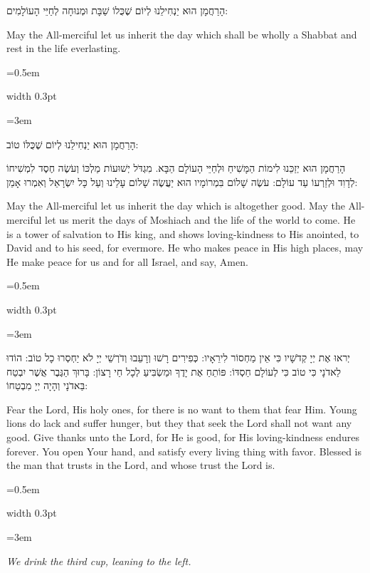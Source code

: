 \documentclass[11pt, openany]{book}
\newcommand{\instruction}[1]{%
  \par\vspace{3pt}
  \begin{tcolorbox}[
    enhanced,
    breakable,
    colback=sederlight,
    colframe=sederlight,
    boxrule=0pt,
    left=10pt,
    right=6pt,
    top=4pt,
    bottom=4pt,
    borderline west={2pt}{0pt}{sederwine!60},
    arc=0pt,
    outer arc=0pt,
  ]
    {\small\itshape\textcolor{sederwine}{#1}}
  \end{tcolorbox}
  \par\vspace{2pt}
}
\newlength{\bidiHebWidth}
\newlength{\bidiEngWidth}
\newenvironment{bilingual}{%
  \par\vspace{4pt}%
}{%
  \noindent
  \begin{minipage}[t]{\bidiEngWidth}
    \setstretch{1.4}\emergencystretch=0.5em\normalsize
    \usebox{\bidiEngBox}
  \end{minipage}%
  \hfill
  {\color{sedergold}\vrule width 0.3pt}%
  \hfill
  \begin{minipage}[t]{\bidiHebWidth}
    \begingroup\hebrewfont\TeXXeTstate=1\beginR
    \large\setstretch{1.4}\emergencystretch=3em\tolerance=9999\parindent=0pt\relax
    \usebox{\bidiHebBox}
    \endR\endgroup
  \end{minipage}%
  \par\vspace{2pt}%
}
\newenvironment{hebrewcol}{%
  \begin{lrbox}{\bidiHebBox}\begin{minipage}{\bidiHebWidth}%
}{%
  \end{minipage}\end{lrbox}%
}
\newenvironment{englishcol}{%
  \begin{lrbox}{\bidiEngBox}\begin{minipage}{\bidiEngWidth}%
}{%
  \end{minipage}\end{lrbox}%
}
\newenvironment{shabbatadd}{%
  \par\vspace{3pt}
  \begin{tcolorbox}[
    enhanced,
    breakable,
    colback=sederblue!6,
    colframe=sederblue!6,
    boxrule=0pt,
    left=10pt,
    right=10pt,
    top=6pt,
    bottom=6pt,
    borderline north={0.5pt}{0pt}{sederblue!25},
    borderline south={0.5pt}{0pt}{sederblue!25},
    arc=0pt,
    outer arc=0pt,
    before upper={\small\textcolor{sederblue}{\textit{On Shabbat add:}}\par\vspace{2pt}},
  ]
}{%
  \end{tcolorbox}
  \par\vspace{3pt}
}
\begin{document}
\begin{shabbatadd}
\begin{bilingual}
\begin{hebrewcol}
הָרַחֲמָן הוּא יַנְחִילֵנוּ לְיוֹם שֶׁכֻּלוֹ שַׁבָּת וּמְנוּחָה לְחַיֵּי הָעוֹלָמִים:
\end{hebrewcol}
\begin{englishcol}
May the All-merciful let us inherit the day which shall be wholly a Shabbat and rest in the life everlasting.
\end{englishcol}
\end{bilingual}
\end{shabbatadd}
\begin{bilingual}
\begin{hebrewcol}
הָרַחֲמָן הוּא יַנְחִילֵנוּ לְיוֹם שֶׁכֻּלּוֹ טוֹב:

הָרַחֲמָן הוּא יְזַכֵּנוּ לִימוֹת הַמָּשִׁיחַ וּלְחַיֵּי הָעוֹלָם הַבָּא. מִגְדֹּל יְשׁוּעוֹת מַלְכּוֹ וְעֹשֶׂה חֶסֶד לִמְשִׁיחוֹ לְדָוִד וּלְזַרְעוֹ עַד עוֹלָם: עֹשֶׂה שָׁלוֹם בִּמְרוֹמָיו הוּא יַעֲשֶׂה שָׁלוֹם עָלֵינוּ וְעַל כָּל יִשְׂרָאֵל וְאִמְרוּ אָמֵן:
\end{hebrewcol}
\begin{englishcol}
May the All-merciful let us inherit the day which is altogether good. May the All-merciful let us merit the days of Moshiach and the life of the world to come. He is a tower of salvation to His king, and shows loving-kindness to His anointed, to David and to his seed, for evermore. He who makes peace in His high places, may He make peace for us and for all Israel, and say, Amen.
\end{englishcol}
\end{bilingual}
\begin{bilingual}
\begin{hebrewcol}
יְראוּ אֶת יְיָ קְדֹשָׁיו כִּי אֵין מַחְסוֹר לִירֵאָיו: כְּפִירִים רָשׁוּ וְרָעֵבוּ וְדֹרְשֵׁי יְיָ לֹא יַחְסְרוּ כָל טוֹב: הוֹדוּ לַאדֹנָי כִּי טוֹב כִּי לְעוֹלָם חַסְדּוֹ: פּוֹתֵחַ אֶת יָדֶךָ וּמַשְׂבִּיעַ לְכָל חַי רָצוֹן: בָּרוּךְ הַגֶּבֶר אֲשֶׁר יִבְטַח בַּאדֹנָי וְהָיָה יְיָ מִבְטַחוֹ:
\end{hebrewcol}
\begin{englishcol}
Fear the Lord, His holy ones, for there is no want to them that fear Him. Young lions do lack and suffer hunger, but they that seek the Lord shall not want any good. Give thanks unto the Lord, for He is good, for His loving-kindness endures forever. You open Your hand, and satisfy every living thing with favor. Blessed is the man that trusts in the Lord, and whose trust the Lord is.
\end{englishcol}
\end{bilingual}
\instruction{We drink the third cup, leaning to the left.}
\end{document}
